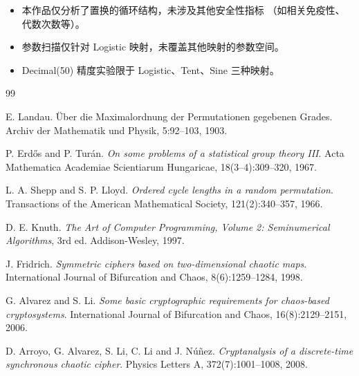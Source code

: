 \documentclass[12pt,a4paper]{ctexrep}
\begin{document}
\begin{itemize}
  \item 本作品仅分析了置换的循环结构，未涉及其他安全性指标
  （如相关免疫性、代数次数等）。
  \item 参数扫描仅针对 Logistic 映射，未覆盖其他映射的参数空间。
  \item Decimal(50) 精度实验限于 Logistic、Tent、Sine 三种映射。
\end{itemize}

\begin{thebibliography}{99}

E. Landau.
Über die Maximalordnung der Permutationen gegebenen Grades.
Archiv der Mathematik und Physik, 5:92--103, 1903.

P. Erd\H{o}s and P. Tur\'{a}n.
\emph{On some problems of a statistical group theory III}.
Acta Mathematica Academiae Scientiarum Hungaricae, 18(3--4):309--320, 1967.

L. A. Shepp and S. P. Lloyd.
\emph{Ordered cycle lengths in a random permutation}.
Transactions of the American Mathematical Society, 121(2):340--357, 1966.

D. E. Knuth.
\emph{The Art of Computer Programming, Volume 2: Seminumerical Algorithms},
3rd ed. Addison-Wesley, 1997.

J. Fridrich.
\emph{Symmetric ciphers based on two-dimensional chaotic maps}.
International Journal of Bifurcation and Chaos, 8(6):1259--1284, 1998.

G. Alvarez and S. Li.
\emph{Some basic cryptographic requirements for chaos-based cryptosystems}.
International Journal of Bifurcation and Chaos, 16(8):2129--2151, 2006.

D. Arroyo, G. Alvarez, S. Li, C. Li and J. N\'{u}\~{n}ez.
\emph{Cryptanalysis of a discrete-time synchronous chaotic cipher}.
Physics Letters A, 372(7):1001--1008, 2008.

\end{thebibliography}
\end{document}
